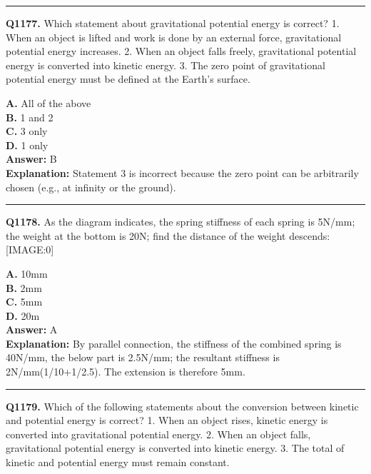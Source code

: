 \documentclass[12pt]{article}
\begin{document}
\hrule
\vspace{1em}


\noindent
\textbf{Q1177.} Which statement about gravitational potential energy is correct?
1.
When an object is lifted and work is done by an external force, gravitational potential energy increases.
2.
When an object falls freely, gravitational potential energy is converted into kinetic energy.
3.
The zero point of gravitational potential energy must be defined at the Earth’s surface.



\textbf{A.} All of the above \\
\textbf{B.} 1 and 2 \\
\textbf{C.} 3 only \\
\textbf{D.} 1 only \\

\textbf{Answer:} B \\
\textbf{Explanation:} Statement 3 is incorrect because the zero point can be arbitrarily chosen (e.g., at infinity or the ground).

\hrule
\vspace{1em}


\noindent
\textbf{Q1178.} As the diagram indicates, the spring stiffness of each spring is 5N/mm; the weight at the bottom is 20N; find the distance of the weight descends:
[IMAGE:0]



\textbf{A.} 10mm \\
\textbf{B.} 2mm \\
\textbf{C.} 5mm \\
\textbf{D.} 20m \\

\textbf{Answer:} A \\
\textbf{Explanation:} By parallel connection, the stiffness of the combined spring is 40N/mm, the below part is 2.5N/mm; the resultant stiffness is 2N/mm(1/10+1/2.5). The extension is therefore 5mm.

\hrule
\vspace{1em}


\noindent
\textbf{Q1179.} Which of the following statements about the conversion between kinetic and potential energy is correct?
1.
When an object rises, kinetic energy is converted into gravitational potential energy.
2.
When an object falls, gravitational potential energy is converted into kinetic energy.
3. The total of kinetic and potential energy must remain constant.
\end{document}
